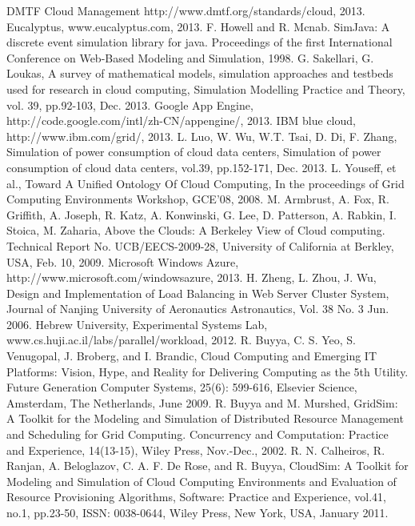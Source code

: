 \documentclass[3p, twocolumn]{elsarticle}
\begin{document}
\begin{thebibliography}{99}
DMTF Cloud Management
http://www.dmtf.org/standards/cloud, 2013.
Eucalyptus, www.eucalyptus.com, 2013.
F. Howell and R. Mcnab. SimJava: A discrete event simulation library for java. Proceedings of the first International Conference on Web-Based Modeling and Simulation, 1998.
G. Sakellari, G. Loukas, A survey of mathematical models, simulation approaches and testbeds used for research in cloud computing, Simulation Modelling Practice and Theory, vol. 39, pp.92-103, Dec. 2013.
Google App Engine, http://code.google.com/intl/zh-CN/appengine/, 2013.
IBM blue cloud, http://www.ibm.com/grid/, 2013.
L. Luo, W. Wu, W.T. Tsai, D. Di, F. Zhang, Simulation of power consumption of cloud data centers, Simulation of power consumption of cloud data centers, vol.39, pp.152-171, Dec. 2013.
L. Youseff, et al., Toward A Unified Ontology Of Cloud Computing, In the proceedings of Grid Computing Environments Workshop, GCE'08, 2008.
M. Armbrust, A. Fox, R. Griffith, A. Joseph, R. Katz, A. Konwinski, G. Lee, D. Patterson, A. Rabkin, I. Stoica, M. Zaharia, Above the Clouds: A Berkeley View of Cloud computing. Technical Report No. UCB/EECS-2009-28, University of California at Berkley, USA, Feb. 10, 2009.
Microsoft Windows Azure,
http://www.microsoft.com/windowsazure, 2013.
H. Zheng, L. Zhou, J. Wu, Design and Implementation of Load Balancing in Web Server Cluster System, Journal of Nanjing University of Aeronautics Astronautics, Vol. 38 No. 3 Jun. 2006.
Hebrew University, Experimental Systems Lab, www.cs.huji.ac.il/labs/parallel/workload, 2012.
R. Buyya, C. S. Yeo, S. Venugopal, J. Broberg, and I. Brandic, Cloud Computing and Emerging IT Platforms: Vision, Hype, and Reality for Delivering Computing as the 5th Utility. Future Generation Computer Systems, 25(6): 599-616, Elsevier Science, Amsterdam, The Netherlands, June 2009.
R. Buyya and M. Murshed, GridSim: A Toolkit for the Modeling and Simulation of Distributed Resource Management and Scheduling for Grid Computing. Concurrency and Computation: Practice and Experience, 14(13-15), Wiley Press, Nov.-Dec., 2002.
R. N. Calheiros, R. Ranjan, A. Beloglazov, C. A. F. De Rose, and R. Buyya, CloudSim: A Toolkit for Modeling and Simulation of Cloud Computing Environments and Evaluation of Resource Provisioning Algorithms, Software: Practice and Experience, vol.41, no.1, pp.23-50, ISSN: 0038-0644, Wiley Press, New York, USA, January 2011.

\end{thebibliography}
\end{document}
